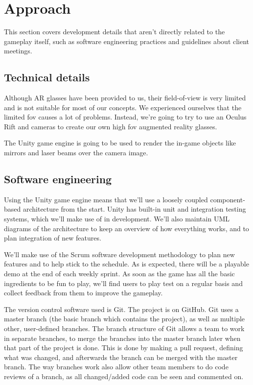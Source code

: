 \section{Approach}

This section covers development details that aren't directly related to the
gameplay itself, such as software engineering practices and guidelines about
client meetings.

\subsection{Technical details}

Although AR glasses have been provided to us, their field-of-view is very
limited and is not suitable for most of our concepts. We experienced ourselves
that the limited fov causes a lot of problems. Instead, we're going to try to
use an Oculus Rift and cameras to create our own high fov augmented reality
glasses.

The Unity game engine is going to be used to render the in-game objects like
mirrors and laser beams over the camera image.

\subsection{Software engineering}

Using the Unity game engine means that we'll use a loosely coupled
component-based architecture from the start. Unity has built-in unit and
integration testing systems, which we'll make use of in development.
We'll also maintain UML diagrams of the architecture to keep an overview of how
everything works, and to plan integration of new features.

We'll make use of the Scrum software development methodology to plan new
features and to help stick to the schedule. As is expected, there will be a
playable demo at the end of each weekly sprint. As soon as the game has all the
basic ingredients to be fun to play, we'll find users to play test on a regular
basis and collect feedback from them to improve the gameplay.

The version control software used is Git. The project is on GitHub. Git uses a 
master branch (the basic branch which contains the project), as well as multiple 
other, user-defined branches. The branch structure of Git allows a team to work 
in separate branches, to merge the branches into the master branch later when 
that part of the project is done. This is done by making a pull request, defining 
what was changed, and afterwards the branch can be merged with the master branch. 
The way branches work also allow other team members to do code reviews of a branch, 
as all changed/added code can be seen and commented on.

